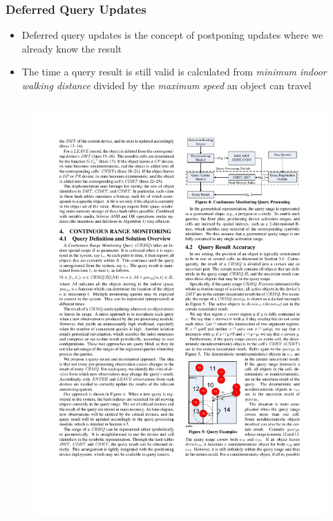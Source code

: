 
\begin{frame}
\frametitle{Deferred Query Updates}

\begin{itemize}
	\item Deferred query updates is the concept of postponing updates where we already know the result
  \item The time a query result is still valid is calculated from \emph{minimum indoor walking distance} divided by the \emph{maximum speed} an object can travel
\end{itemize}

\begin{columns}[c]

  \begin{figure}[tb]
    \includegraphics[width=\columnwidth]{figures/2-2/2-2-5.pdf}
  \end{figure}

\end{columns}

\end{frame}

